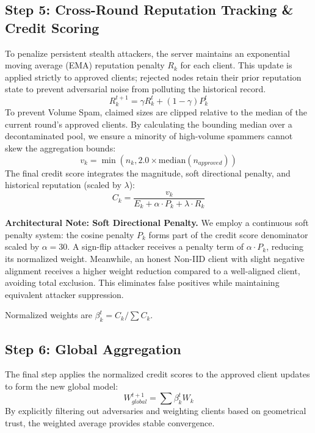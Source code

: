 \documentclass[10pt, conference]{IEEEtran}
\begin{document}
\subsection{Step 5: Cross-Round Reputation Tracking \& Credit Scoring}
To penalize persistent stealth attackers, the server maintains an exponential moving average (EMA) reputation penalty $R_k$ for each client. This update is applied strictly to approved clients; rejected nodes retain their prior reputation state to prevent adversarial noise from polluting the historical record.
\begin{equation}
R_k^{t+1} = \gamma R_k^t + (1 - \gamma) P_k^t
\end{equation}
To prevent Volume Spam, claimed sizes are clipped relative to the median of the current round's approved clients. By calculating the bounding median over a decontaminated pool, we ensure a minority of high-volume spammers cannot skew the aggregation bounds:
\begin{equation}
v_k = \min(n_k, 2.0 \times \text{median}(n_{approved}))
\end{equation}
The final credit score integrates the magnitude, soft directional penalty, and historical reputation (scaled by $\lambda$):
\begin{equation}
C_k = \frac{v_k}{E_k + \alpha \cdot P_k + \lambda \cdot R_k}
\end{equation}

\textbf{Architectural Note: Soft Directional Penalty.}
We employ a continuous soft penalty system: the cosine penalty $P_k$ forms part of the credit score denominator scaled by $\alpha = 30$. A sign-flip attacker receives a penalty term of $\alpha \cdot P_k$, reducing its normalized weight. Meanwhile, an honest Non-IID client with slight negative alignment receives a higher weight reduction compared to a well-aligned client, avoiding total exclusion. This eliminates false positives while maintaining equivalent attacker suppression.

Normalized weights are $\beta_k^t = C_k / \sum C_k$.

\subsection{Step 6: Global Aggregation}
The final step applies the normalized credit scores to the approved client updates to form the new global model:
\begin{equation}
W_{global}^{t+1} = \sum \beta_k^t W_k
\end{equation}
By explicitly filtering out adversaries and weighting clients based on geometrical trust, the weighted average provides stable convergence.
\end{document}
